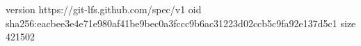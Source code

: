 version https://git-lfs.github.com/spec/v1
oid sha256:eacbee3e4e71e980af41be9bec0a3fccc9b6ac31223d02ccb5c9fa92e137d5c1
size 421502
